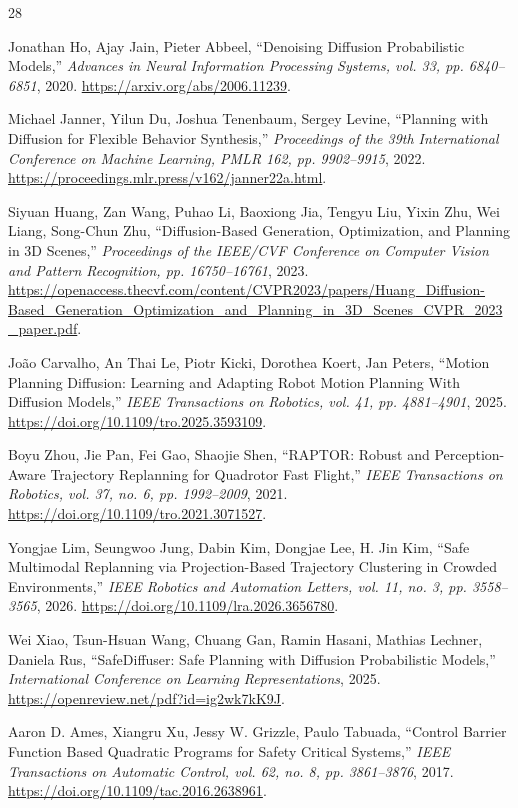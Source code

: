 \documentclass[journal]{IEEEtran}
\begin{document}
\begin{thebibliography}{28}

Jonathan Ho, Ajay Jain, Pieter Abbeel, ``Denoising Diffusion Probabilistic Models,'' \emph{Advances in Neural Information Processing Systems, vol. 33, pp. 6840--6851}, 2020.
\url{https://arxiv.org/abs/2006.11239}.

Michael Janner, Yilun Du, Joshua Tenenbaum, Sergey Levine, ``Planning with Diffusion for Flexible Behavior Synthesis,'' \emph{Proceedings of the 39th International Conference on Machine Learning, PMLR 162, pp. 9902--9915}, 2022.
\url{https://proceedings.mlr.press/v162/janner22a.html}.

Siyuan Huang, Zan Wang, Puhao Li, Baoxiong Jia, Tengyu Liu, Yixin Zhu, Wei Liang, Song-Chun Zhu, ``Diffusion-Based Generation, Optimization, and Planning in 3D Scenes,'' \emph{Proceedings of the IEEE/CVF Conference on Computer Vision and Pattern Recognition, pp. 16750--16761}, 2023.
\url{https://openaccess.thecvf.com/content/CVPR2023/papers/Huang_Diffusion-Based_Generation_Optimization_and_Planning_in_3D_Scenes_CVPR_2023_paper.pdf}.

Jo\~ao Carvalho, An Thai Le, Piotr Kicki, Dorothea Koert, Jan Peters, ``Motion Planning Diffusion: Learning and Adapting Robot Motion Planning With Diffusion Models,'' \emph{IEEE Transactions on Robotics, vol. 41, pp. 4881--4901}, 2025.
\url{https://doi.org/10.1109/tro.2025.3593109}.

Boyu Zhou, Jie Pan, Fei Gao, Shaojie Shen, ``RAPTOR: Robust and Perception-Aware Trajectory Replanning for Quadrotor Fast Flight,'' \emph{IEEE Transactions on Robotics, vol. 37, no. 6, pp. 1992--2009}, 2021.
\url{https://doi.org/10.1109/tro.2021.3071527}.

Yongjae Lim, Seungwoo Jung, Dabin Kim, Dongjae Lee, H. Jin Kim, ``Safe Multimodal Replanning via Projection-Based Trajectory Clustering in Crowded Environments,'' \emph{IEEE Robotics and Automation Letters, vol. 11, no. 3, pp. 3558--3565}, 2026.
\url{https://doi.org/10.1109/lra.2026.3656780}.

Wei Xiao, Tsun-Hsuan Wang, Chuang Gan, Ramin Hasani, Mathias Lechner, Daniela Rus, ``SafeDiffuser: Safe Planning with Diffusion Probabilistic Models,'' \emph{International Conference on Learning Representations}, 2025.
\url{https://openreview.net/pdf?id=ig2wk7kK9J}.

Aaron D. Ames, Xiangru Xu, Jessy W. Grizzle, Paulo Tabuada, ``Control Barrier Function Based Quadratic Programs for Safety Critical Systems,'' \emph{IEEE Transactions on Automatic Control, vol. 62, no. 8, pp. 3861--3876}, 2017.
\url{https://doi.org/10.1109/tac.2016.2638961}.


\end{thebibliography}
\end{document}
